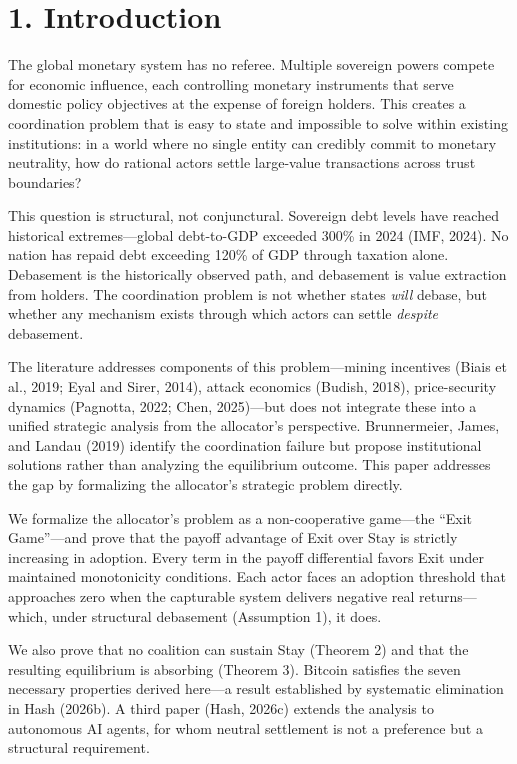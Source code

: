 \documentclass[12pt]{article}
\theoremstyle{definition}
\theoremstyle{remark}
\begin{document}
\newpage


\section{1. Introduction}

The global monetary system has no referee. Multiple sovereign powers
compete for economic influence, each controlling monetary instruments
that serve domestic policy objectives at the expense of foreign holders.
This creates a coordination problem that is easy to state and impossible to solve within existing institutions: in a
world where no single entity can credibly commit to monetary neutrality,
how do rational actors settle large-value transactions across trust
boundaries?

This question is structural, not conjunctural. Sovereign debt levels
have reached historical extremes---global debt-to-GDP exceeded 300\%
in 2024 (IMF, 2024). No nation has repaid debt exceeding 120\% of GDP
through taxation alone. Debasement is the historically observed path,
and debasement is value extraction from holders. The coordination problem
is not whether states \emph{will} debase, but whether any mechanism exists
through which actors can settle \emph{despite} debasement.

The literature addresses components of this problem---mining incentives
(Biais et al., 2019; Eyal and Sirer, 2014), attack economics (Budish,
2018), price-security dynamics (Pagnotta, 2022; Chen, 2025)---but does
not integrate these into a unified strategic analysis from the
allocator's perspective. Brunnermeier, James, and Landau (2019) identify
the coordination failure but propose institutional solutions rather than
analyzing the equilibrium outcome. This paper addresses the gap by formalizing the allocator's strategic
problem directly.

We formalize the allocator's problem as a non-cooperative game---the
``Exit Game''---and prove that the payoff advantage of Exit over Stay is
strictly increasing in adoption. Every term in the payoff differential
favors Exit under maintained monotonicity conditions. Each actor faces
an adoption threshold that approaches zero when the capturable system
delivers negative real returns---which, under structural debasement
(Assumption 1), it does.

We also prove that no coalition can sustain Stay (Theorem 2) and that
the resulting equilibrium is absorbing (Theorem 3). Bitcoin satisfies
the seven necessary properties derived here---a result established by
systematic elimination in Hash (2026b). A third paper (Hash, 2026c)
extends the analysis to autonomous AI agents, for whom neutral
settlement is not a preference but a structural requirement.
\end{document}
